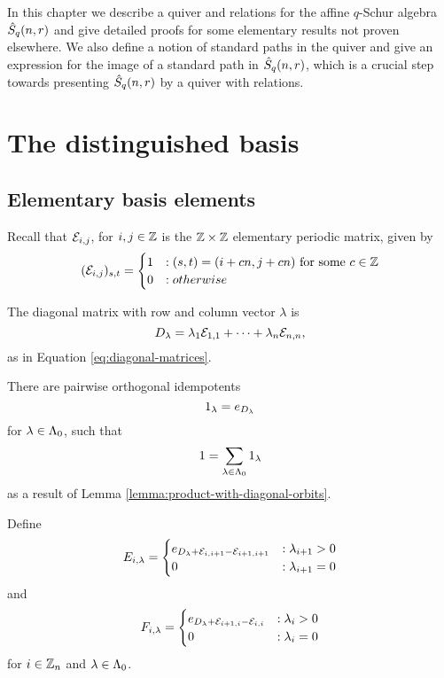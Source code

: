 \documentclass[a4paper, 11pt, twoside]{report}
\begin{document}
In this chapter we describe a quiver and relations for the affine $q$-Schur algebra $\hat{S}_q(n,r)$ and give detailed proofs for some elementary results not proven elsewhere. We also define a notion of standard paths in the quiver and give an expression for the image of a standard path in $\hat{S}_q(n,r)$, which is a crucial step towards presenting $\hat{S}_q(n,r)$ by a quiver with relations.

\section{The distinguished basis}

\subsection{Elementary basis elements}

Recall that $\mathcal{E}_{i,j}$, for $i,j\in\mathbb{Z}$ is the $\mathbb{Z}\times\mathbb{Z}$ elementary periodic matrix, given by
\begin{equation*}
(\mathcal{E}_{i,j})_{s,t} = \begin{cases}
1 &: (s,t)=(i+cn,j+cn)\text{ for some }c\in\mathbb{Z}\\
0 &: otherwise
\end{cases}
\end{equation*}

The diagonal matrix with row and column vector $\lambda$ is
\begin{equation*}
D_{\lambda} = \lambda_1\mathcal{E}_{1,1} +\cdots + \lambda_n\mathcal{E}_{n,n},
\end{equation*}
as in Equation \eqref{eq:diagonal-matrices}.

There are pairwise orthogonal idempotents
\begin{equation*}
1_\lambda = e_{D_{\lambda}}
\end{equation*}
for $\lambda\in\Lambda_0{}$, such that
\begin{equation*}
1 = \sum_{\lambda\in\Lambda_0{}} 1_\lambda
\end{equation*}
as a result of Lemma \ref{lemma:product-with-diagonal-orbits}.

Define
\begin{equation*}
E_{i,\lambda} = \begin{cases}
e_{D_{\lambda} +\mathcal{E}_{i,i+1} -\mathcal{E}_{i+1,i+1}} &: \lambda_{i+1}>0\\
0 &: \lambda_{i+1}=0
\end{cases}
\end{equation*}
and
\begin{equation*}
F_{i,\lambda} = \begin{cases}
e_{D_{\lambda} +\mathcal{E}_{i+1,i} - \mathcal{E}_{i,i}} &: \lambda_i>0\\
0 &: \lambda_i=0
\end{cases}
\end{equation*}
for $i\in\mathbb{Z}_n$ and $\lambda\in\Lambda_0{}$.
\end{document}
